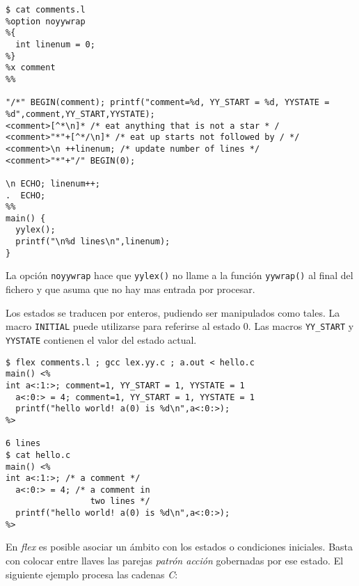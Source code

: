 \begin{verbatim}
$ cat comments.l
%option noyywrap
%{
  int linenum = 0;
%}
%x comment
%%
 
"/*" BEGIN(comment); printf("comment=%d, YY_START = %d, YYSTATE = %d",comment,YY_START,YYSTATE);
<comment>[^*\n]* /* eat anything that is not a star * /
<comment>"*"+[^*/\n]* /* eat up starts not followed by / */
<comment>\n ++linenum; /* update number of lines */
<comment>"*"+"/" BEGIN(0);
 
\n ECHO; linenum++;
.  ECHO;
%%
main() {
  yylex();
  printf("\n%d lines\n",linenum);
}
\end{verbatim}
La opción \verb|noyywrap| hace que \verb|yylex()| no llame a la función \verb|yywrap()|
al final del fichero y que asuma que no hay mas entrada por procesar.

Los estados se traducen por enteros, pudiendo ser manipulados como tales.
La macro \verb|INITIAL| puede utilizarse para referirse al estado 0.
Las macros \verb|YY_START| y \verb|YYSTATE| contienen el valor del estado actual.
\begin{verbatim}
$ flex comments.l ; gcc lex.yy.c ; a.out < hello.c
main() <%
int a<:1:>; comment=1, YY_START = 1, YYSTATE = 1
  a<:0:> = 4; comment=1, YY_START = 1, YYSTATE = 1
  printf("hello world! a(0) is %d\n",a<:0:>);
%>
 
6 lines     
$ cat hello.c
main() <%
int a<:1:>; /* a comment */
  a<:0:> = 4; /* a comment in
                 two lines */
  printf("hello world! a(0) is %d\n",a<:0:>);
%>                                  
\end{verbatim}
En \emph{flex} es posible asociar un \'ambito con los estados o 
condiciones iniciales. Basta con colocar entre llaves las 
parejas \emph{patr\'on acci\'on} gobernadas por ese estado.
El siguiente ejemplo procesa las cadenas \emph{C}:
